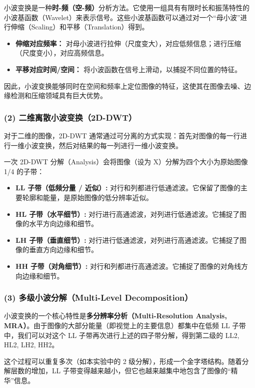 \documentclass[a4paper]{ctexart}
\begin{document}
	小波变换是一种\textbf{时-频（空-频）}分析方法。它使用一组具有有限时长和振荡特性的小波基函数（Wavelet）来表示信号。这些小波基函数可以通过对一个“母小波”进行伸缩（Scaling）和平移（Translation）得到。
	\begin{itemize}
		\item \textbf{伸缩对应频率：} 对母小波进行拉伸（尺度变大），对应低频信息；进行压缩（尺度变小），对应高频信息。
		\item \textbf{平移对应时间/空间：} 将小波函数在信号上滑动，以捕捉不同位置的特征。
	\end{itemize}
	因此，小波变换能够同时在空间和频率上定位图像的特征，这使其在图像去噪、边缘检测和压缩领域具有巨大优势。
	
	\subsubsection{(2) 二维离散小波变换（2D-DWT）}
	对于二维的图像，2D-DWT 通常通过可分离的方式实现：首先对图像的每一行进行一维小波变换，然后对结果的每一列进行一维小波变换。
	
	一次 2D-DWT 分解（Analysis）会将图像（设为 X）分解为四个大小为原始图像 1/4 的子带：
	\begin{itemize}
		\item \textbf{LL 子带（低频分量 / 近似）:} 对行和列都进行低通滤波。它保留了图像的主要轮廓和能量，是原始图像的低分辨率近似。
		\item \textbf{HL 子带（水平细节）:} 对行进行高通滤波，对列进行低通滤波。它捕捉了图像的水平方向边缘和细节。
		\item \textbf{LH 子带（垂直细节）:} 对行进行低通滤波，对列进行高通滤波。它捕捉了图像的垂直方向边缘和细节。
		\item \textbf{HH 子带（对角细节）:} 对行和列都进行高通滤波。它捕捉了图像的对角线方向边缘和细节。
	\end{itemize}
	
	\subsubsection{(3) 多级小波分解（Multi-Level Decomposition）}
	小波变换的一个核心特性是\textbf{多分辨率分析（Multi-Resolution Analysis, MRA）}。由于图像的大部分能量（即视觉上的主要信息）都集中在低频 LL 子带中，我们可以对这个 LL 子带再次进行上述的四子带分解，得到第二级的 LL2, HL2, LH2, HH2。
	
	这个过程可以重复多次（如本实验中的 2 级分解），形成一个金字塔结构。随着分解层数的增加，LL 子带变得越来越小，但它也越来越集中地包含了图像的“精华”信息。
	
\end{document}
